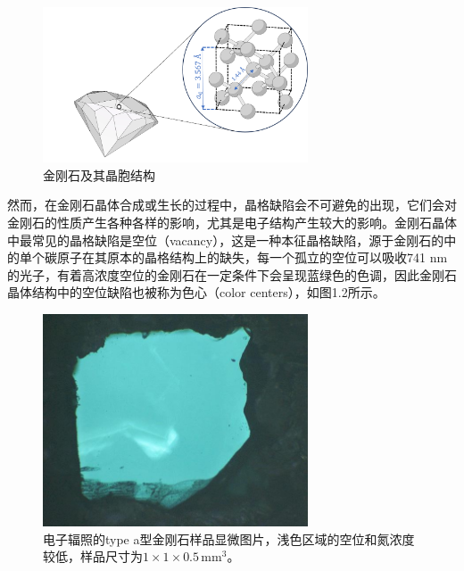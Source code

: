\documentclass[type = bachelor]{whu-thesis}
\begin{document}
\begin{figure}[h]
  \centering
  \includegraphics[width=0.7\textwidth]{figures/Chapter 1/Diamond Lattice.png}
  \caption{金刚石及其晶胞结构}
  \label{fig:Diamond Lattice}
\end{figure}

然而，在金刚石晶体合成或生长的过程中，晶格缺陷会不可避免的出现，它们会对金刚石的性质产生各种各样的影响，尤其是电子结构产生较大的影响\cite{jelezko2006single, nebel2003electronic}。金刚石晶体中最常见的晶格缺陷是空位（vacancy），这是一种本征晶格缺陷，源于金刚石的中的单个碳原子在其原本的晶格结构上的缺失，每一个孤立的空位可以吸收741 nm的光子，有着高浓度空位的金刚石在一定条件下会呈现蓝绿色的色调，因此金刚石晶体结构中的空位缺陷也被称为色心（color centers），如图1.2所示\cite{waldermann2007creating, kiflawi2007electron}。

\begin{figure}
  \centering
  \includegraphics[width=0.7\textwidth]{figures/Chapter 1/Color Center.jpg}
  \caption{电子辐照的type \uppercase\expandafter{}a型金刚石样品显微图片，浅色区域的空位和氮浓度较低，样品尺寸为\(1\times1\times0.5 \, \mathrm{mm^3}\)。}
  \label{fig:Color Center}
\end{figure}
\end{document}
